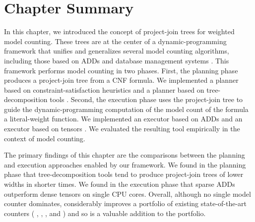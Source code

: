 \section{Chapter Summary}
\label{sec_discussion}

In this chapter, we introduced the concept of project-join trees for weighted model counting.
These trees are at the center of a dynamic-programming framework that unifies and generalizes several model counting algorithms, including those based on ADDs \cite{DPV20} and database management systems \cite{fichte2020exploiting}.
This framework performs model counting in two phases.
First, the planning phase produces a project-join tree from a CNF formula.
We implemented a planner \Htb{} based on constraint-satisfaction heuristics
\cite{tarjan1984simple,koster2001treewidth,dechter03,dechter99,bouquet1999gestion}
and a planner \Lg{} based on tree-decomposition tools \cite{strasser2017computing,Tamaki17,AMW17}.
Second, the execution phase uses the project-join tree to guide the dynamic-programming computation of the model count of the formula \wrt{} a literal-weight function.
We implemented an executor \Dmc{} based on ADDs \cite{DPV20,somenzi2015cudd} and an executor \Tensor{} based on tensors \cite{numpy}.
We evaluated the resulting tool \Dpmc{} empirically in the context of model counting.

{ \color{blue}
The primary findings of this chapter are the comparisons between the planning and execution approaches enabled by our framework.
We found in the planning phase that tree-decomposition tools tend to produce project-join trees of lower widths in shorter times.
We found in the execution phase that sparse ADDs outperform dense tensors on single CPU cores.
Overall, although no single model counter dominates, \Dpmc{} considerably improves a portfolio of existing state-of-the-art counters (\cachet{} \cite{sang2004combining}, \ctd{} \cite{darwiche2004new}, \df{} \cite{LM17}, and \minictd{} \cite{OD15}) and so is a valuable addition to the portfolio.
} %